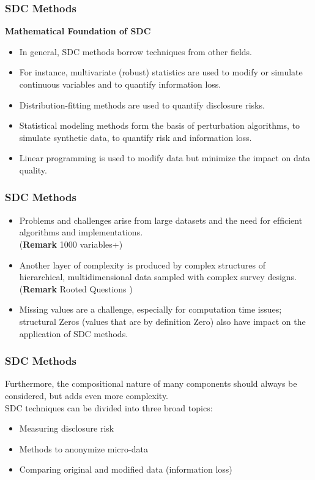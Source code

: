\documentclass{beamer}
\begin{document}
\begin{frame}
\frametitle{SDC Methods} 
\textbf{Mathematical Foundation of SDC}
\begin{itemize}
\item In general, SDC methods borrow techniques from other ﬁelds. 
\item For instance, multivariate (robust) statistics are used to modify or simulate continuous variables and
to quantify information loss. 

\item Distribution-fitting methods are used to quantify
disclosure risks.
\item Statistical modeling methods form the basis of perturbation algorithms, to simulate synthetic data, to quantify risk and information loss. 
\item Linear
programming is used to modify data but minimize the impact on data quality.
\end{itemize}
\end{frame}
\begin{frame}
	\frametitle{SDC Methods} 
	\begin{itemize}
		\item
Problems and challenges arise from large datasets and the need for efﬁcient algorithms and implementations.\\ (\textbf{Remark} 1000 variables+)
\item Another layer of complexity is produced by complex
structures of hierarchical, multidimensional data sampled with complex survey designs. \\ (\textbf{Remark} Rooted Questions )
\item 
Missing values are a challenge, especially for computation time issues; structural Zeros (values that are by deﬁnition Zero) also have impact on the application
of SDC methods. 
\end{itemize}
\end{frame}
\begin{frame}
	\frametitle{SDC Methods} 
Furthermore, the compositional nature of many components
should always be considered, but adds even more complexity.\\ \bigskip
SDC techniques can be divided into three broad topics:
\begin{itemize}
\item Measuring disclosure risk %
\item Methods to anonymize micro-data %
\item Comparing original and modiﬁed data (information loss) %
\end{itemize}
\end{frame}
\end{document}
